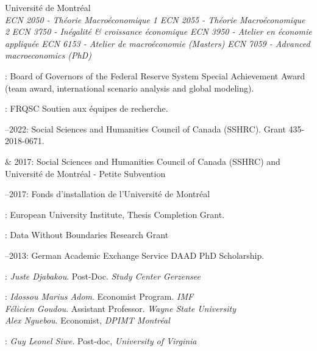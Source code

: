 \documentclass[11pt]{article}
\begin{document}
\smallskip
\begin{samepage}
\ind Université de Montréal \\
 \emph{ECN 2050 - Théorie Macroéconomique 1} \newline
\emph{ECN 2055 - Théorie Macroéconomique 2}   \newline
\emph{ECN 3750 - Inégalité \& croissance économique} \newline
\emph{ECN 3950 - Atelier en économie appliquée} \newline
\emph{ECN 6153 -  Atelier de macroéconomie (Masters)} \newline
\emph{ECN 7059 - Advanced macroeconomics (PhD)}
\par\end{samepage}


: Board of Governors of the Federal Reserve System Special Achievement Award (team award, international scenario analysis and global modeling).

: FRQSC Soutien aux équipes de recherche.

--2022: Social Sciences and Humanities Council of Canada (SSHRC). Grant 435-2018-0671.

 \& 2017: Social Sciences and Humanities Council of Canada (SSHRC) and Université de Montréal - Petite Subvention

--2017: Fonds d'installation de l'Université de Montréal

: European University Institute, Thesis Completion Grant.

: Data Without Boundaries Research Grant

--2013: German Academic Exchange Service DAAD PhD Scholarship.




:   \emph{Juste Djabakou}. Post-Doc. \emph{Study Center Gerzensee}  

: \emph{Idossou Marius Adom}. Economist Program. \emph{IMF}  \\
	 \emph{Félicien Goudou}. Assistant Professor. \emph{Wayne State University}\\
	 \emph{Alex Nguebou}. Economist, \emph{DPIMT Montréal}

: \emph{Guy Leonel Siwe}. Post-doc, \emph{University of Virginia}
\end{document}
